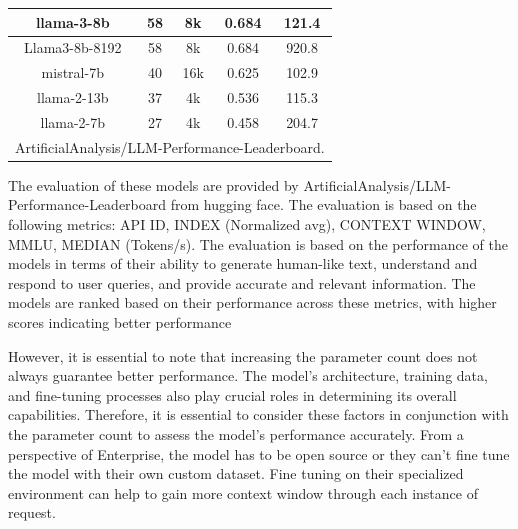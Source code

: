 \documentclass[conference]{IEEEtran}
\begin{document}
\begin{table}[htbp]
\begin{tabular}{|c|c|c|c|c|}
        \hline
        llama-3-8b                                                     & 58   & 8k   & 0.684   & 121.4 \\
        \hline
        Llama3-8b-8192                                                 & 58   & 8k   & 0.684   & 920.8 \\
        \hline
        mistral-7b                                                     & 40   & 16k  & 0.625   & 102.9 \\
        \hline
        llama-2-13b                                                    & 37   & 4k   & 0.536   & 115.3 \\
        \hline
        llama-2-7b                                                     & 27   & 4k   & 0.458   & 204.7 \\
        \hline
        \multicolumn{5}{l}{ArtificialAnalysis/LLM-Performance-Leaderboard.}
    \end{tabular}
\end{table}

The evaluation of these models are provided by
ArtificialAnalysis/LLM-Performance-Leaderboard from hugging face. The
evaluation is based on the following metrics: API ID, INDEX (Normalized avg),
CONTEXT WINDOW, MMLU, MEDIAN (Tokens/s). The evaluation is based on the
performance of the models in terms of their ability to generate human-like
text, understand and respond to user queries, and provide accurate and relevant
information. The models are ranked based on their performance across these
metrics, with higher scores indicating better performance

However, it is essential to note that increasing the parameter count does not
always guarantee better performance. The model's architecture, training data,
and fine-tuning processes also play crucial roles in determining its overall
capabilities. Therefore, it is essential to consider these factors in
conjunction with the parameter count to assess the model's performance
accurately. From a perspective of Enterprise, the model has to be open source
or they can't fine tune the model with their own custom dataset. Fine tuning on
their specialized environment can help to gain more context window through each
instance of request.
\end{document}
